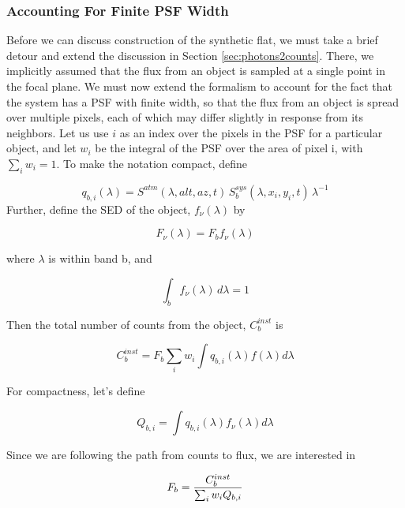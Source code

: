 \documentclass[12pt,preprint]{aastex}
\begin{document}
\subsubsection{Accounting For Finite PSF Width}
\label{sec:pixelization}
Before we can discuss construction of the synthetic flat, we must take a brief detour and extend the discussion 
in Section \ref{sec:photons2counts}.  There, we implicitly assumed that the flux from an object is 
sampled at a single point in the 
focal plane.  We must now extend the formalism to account for the fact that the system has a PSF with finite width, 
so that the flux from an object is spread
over multiple pixels, each of which may differ slightly in response from its neighbors.   Let us use $i$ as an index over the
pixels in the PSF for a particular object, and let $w_i$ be the integral of the PSF over the area of pixel i, with
$\sum_i{w_i}=1$.  To make the
notation compact, define

\begin{equation}
q_{b,i}(\lambda) = {S^{atm}(\lambda,alt,az,t)\, S_b^{sys}(\lambda,x_i,y_i,t) \, \lambda^{-1}}
\end{equation}
Further, define the SED of the object, $f_\nu(\lambda)$ by

\begin{equation}
F_\nu(\lambda) = F_b f_\nu(\lambda)
\end{equation}

where $\lambda$ is within band b, and

\begin{equation}
\int_b {f_\nu(\lambda) \, d\lambda} = 1
\end{equation}

Then the total number of counts from the object, $C_b^{inst}$ is

\begin{equation}
C_b^{inst} = F_b \sum_i {w_i \int {q_{b,i}(\lambda) f(\lambda)  d\lambda}}
\end{equation}

For compactness, let's define

\begin{equation}
Q_{b,i} = \int {q_{b,i}(\lambda) f_\nu(\lambda) d\lambda}
\end{equation}

Since we are following the path from counts to flux, we are interested in

\begin{equation}
F_b = {C_b^{inst} \over {\sum_i{w_i Q_{b,i}}}}
\label{eqn:trueFlat}
\end{equation}
\end{document}
